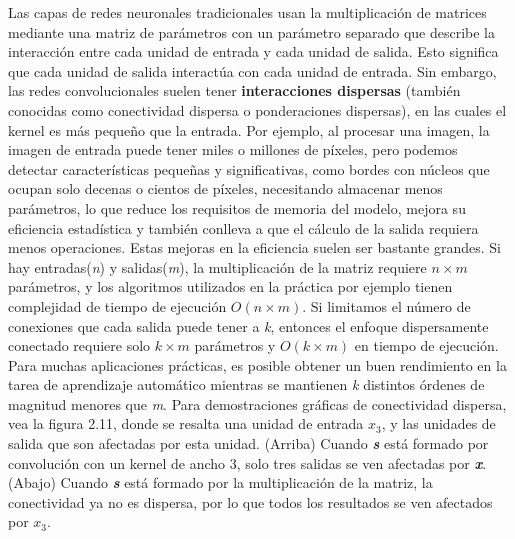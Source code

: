 		\vskip 0.4cm  
		Las capas de redes neuronales tradicionales usan la multiplicación de matrices mediante una matriz de parámetros con un parámetro separado que describe la interacción entre cada unidad de entrada y cada unidad de salida. Esto significa que cada unidad de salida interactúa con cada unidad de entrada. Sin embargo, las redes convolucionales suelen tener {\bf interacciones dispersas} (también conocidas como conectividad dispersa o ponderaciones dispersas), en las cuales el kernel es más pequeño que la entrada. Por ejemplo, al procesar una imagen, la imagen de entrada puede tener miles o millones de píxeles, pero podemos detectar características pequeñas y significativas, como bordes con núcleos que ocupan solo decenas o cientos de píxeles, necesitando almacenar menos parámetros, lo que reduce los requisitos de memoria del modelo, mejora su eficiencia estadística y también conlleva a que el cálculo de la salida requiera menos operaciones.
		\vskip 0.4cm
		Estas mejoras en la eficiencia suelen ser bastante grandes. Si hay entradas({\textit n}) y salidas({\textit m}), la multiplicación de la matriz requiere $n \times m$ parámetros, y los algoritmos utilizados en la práctica por ejemplo tienen complejidad de tiempo de ejecución $O(n \times m)$. Si limitamos el número de conexiones que cada salida puede tener a {\textit k}, entonces el enfoque dispersamente conectado requiere solo $k \times m$ parámetros y $O(k \times m)$ en tiempo de ejecución. Para muchas aplicaciones prácticas, es posible obtener un buen rendimiento en la tarea de aprendizaje automático mientras se mantienen {\textit k} distintos órdenes de magnitud menores que {\textit m}. Para demostraciones gráficas de conectividad dispersa, vea la figura 2.11, donde se resalta una unidad de entrada $x_{3}$, y las unidades de salida que son afectadas por esta unidad. (Arriba) Cuando {\bf {\textit {s}}} está formado por convolución con un kernel de ancho 3, solo tres salidas se ven afectadas por {\bf \textit  x}. (Abajo) Cuando {\bf \textit s} está formado por la multiplicación de la matriz, la conectividad ya no es dispersa, por lo que todos los resultados se ven afectados por $x_{3}$.

